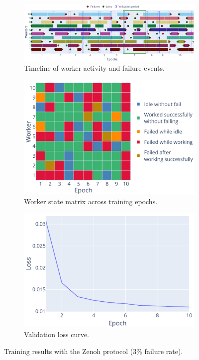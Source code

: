 \begin{figure}[!htb]
    \centering
    \begin{subfigure}[b]{\linewidth}
        \centering
        \includegraphics[width=\linewidth]{figs/scenario2/zenoh_timeline.pdf}
        \caption{Timeline of worker activity and failure events.}
        \label{fig:timeline_zenoh}
    \end{subfigure}
    \begin{subfigure}[b]{0.6\linewidth}
        \centering
        \includegraphics[width=\linewidth]{figs/scenario2/zenoh_status.pdf}
        \caption{Worker state matrix across training epochs.}
        \label{fig:states_zenoh}
    \end{subfigure}
    \begin{subfigure}[b]{0.6\linewidth}
        \centering
        \includegraphics[width=\linewidth]{figs/scenario2/zenoh_loss.pdf}
        \caption{Validation loss curve.}
        \label{fig:loss_zenoh}
    \end{subfigure}
    \caption{Training results with the Zenoh protocol (3\% failure rate).}
    \label{fig:results_zenoh}
\end{figure}

